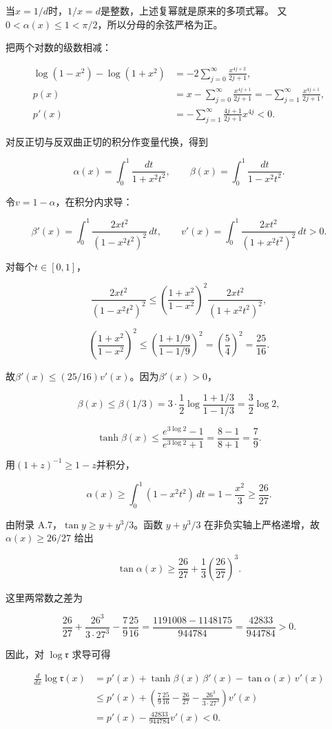 \documentclass[11pt,a4paper]{article}
\begin{document}
当\(x=1/d\)时，\(1/x=d\)是整数，上述复幂就是原来的多项式幂。 又\(0<\alpha(x)\le1<\pi/2\)，所以分母的余弦严格为正。

把两个对数的级数相减：

\[\begin{aligned}
\log(1-x^2)-\log(1+x^2)
&=-2\sum_{j=0}^\infty\frac{x^{4j+2}}{2j+1},\\
p(x)&=x-\sum_{j=0}^\infty\frac{x^{4j+1}}{2j+1}
=-\sum_{j=1}^\infty\frac{x^{4j+1}}{2j+1},\\
p'(x)&=-\sum_{j=1}^\infty
\frac{4j+1}{2j+1}x^{4j}<0.
\end{aligned}\]

对反正切与反双曲正切的积分作变量代换，得到

\[\alpha(x)=\int_0^1\frac{dt}{1+x^2t^2},\qquad
\beta(x)=\int_0^1\frac{dt}{1-x^2t^2}.\]

令\(v=1-\alpha\)，在积分内求导：

\[\beta'(x)=\int_0^1\frac{2xt^2}{(1-x^2t^2)^2}\,dt,
\qquad
v'(x)=\int_0^1\frac{2xt^2}{(1+x^2t^2)^2}\,dt>0.\]

对每个\(t\in[0,1]\)，

\[\frac{2xt^2}{(1-x^2t^2)^2}
\le\left(\frac{1+x^2}{1-x^2}\right)^2
\frac{2xt^2}{(1+x^2t^2)^2},\]

\[\left(\frac{1+x^2}{1-x^2}\right)^2
\le\left(\frac{1+1/9}{1-1/9}\right)^2
=\left(\frac54\right)^2=\frac{25}{16}.\]

故\(\beta'(x)\le(25/16)v'(x)\)。因为\(\beta'(x)>0\)，

\[\beta(x)\le\beta(1/3)
=3\cdot\frac12\log\frac{1+1/3}{1-1/3}
=\frac32\log2,\]

\[\tanh\beta(x)
\le\frac{e^{3\log2}-1}{e^{3\log2}+1}
=\frac{8-1}{8+1}=\frac79.\]

用\((1+z)^{-1}\ge1-z\)并积分，

\[\alpha(x)\ge\int_0^1(1-x^2t^2)\,dt
=1-\frac{x^2}{3}\ge\frac{26}{27}.\]

由附录 A.7，\(\tan y\ge y+y^3/3\)。函数 \(y+y^3/3\) 在非负实轴上严格递增，故 \(\alpha(x)\ge26/27\) 给出

\[\tan\alpha(x)
\ge\frac{26}{27}+\frac13\left(\frac{26}{27}\right)^3.\]

这里两常数之差为

\[\frac{26}{27}+\frac{26^3}{3\cdot27^3}
-\frac79\frac{25}{16}
=\frac{1191008-1148175}{944784}
=\frac{42833}{944784}>0.\]

因此，对 \(\log\mathfrak r\) 求导可得

\[\begin{aligned}
\frac d{dx}\log\mathfrak r(x)
&=p'(x)+\tanh\beta(x)\,\beta'(x)
-\tan\alpha(x)\,v'(x)\\
&\le p'(x)
+\left(\frac79\frac{25}{16}
-\frac{26}{27}-\frac{26^3}{3\cdot27^3}\right)v'(x)\\
&=p'(x)-\frac{42833}{944784}v'(x)<0.
\end{aligned}\]
\end{document}
